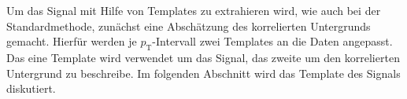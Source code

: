 Um das Signal mit Hilfe von Templates zu extrahieren wird, wie auch bei der Standardmethode, zunächst eine Abschätzung des korrelierten Untergrunds gemacht.
Hierfür werden je $p_\text{T}$-Intervall zwei Templates an die Daten angepasst.
Das eine Template wird verwendet um das Signal, das zweite um den korrelierten Untergrund zu beschreibe.
\newline
Im folgenden Abschnitt wird das Template des Signals diskutiert. 